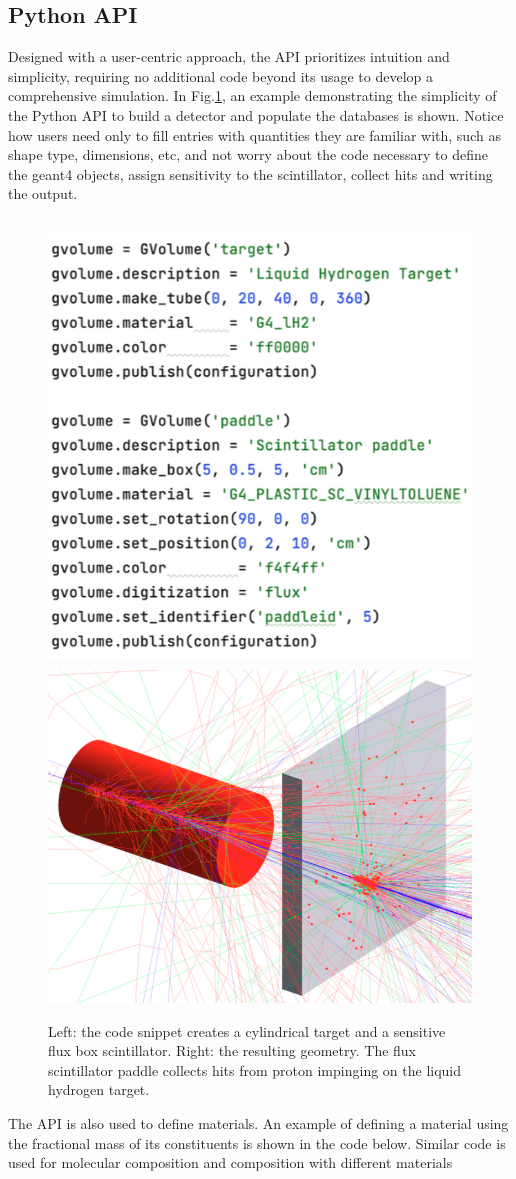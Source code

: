 \subsection{Python API}
\label{subsec:api}
Designed with a user-centric approach, the API prioritizes intuition and simplicity,
requiring no additional code beyond its usage to develop a comprehensive simulation.
In Fig.\ref{fig:api}, an example demonstrating the simplicity of the Python API to build
a detector and populate the databases is shown.
Notice how users need only to fill entries with
quantities they are familiar with, such as shape type, dimensions, etc, and not
worry about the code necessary to define the geant4 objects, assign sensitivity to the
scintillator, collect hits and writing the output.

\begin{figure}[h]
    \centering
    \includegraphics[width=.40\textwidth]{img/api_snippet}
    \includegraphics[width=.58\textwidth]{img/api}
    \caption{
        Left: the code snippet creates a cylindrical target and a sensitive flux box scintillator.
        Right: the resulting geometry. The flux scintillator paddle collects hits from proton
        impinging on the liquid hydrogen target.}
    \label{fig:api}
\end{figure}

The API is also used to define materials.
An example of defining a material using the fractional
mass of its constituents is shown in the code below.
Similar code is used for molecular composition and
composition with different materials

